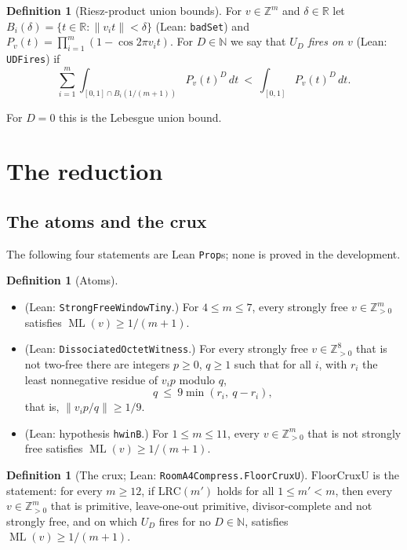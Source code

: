 \documentclass[11pt]{amsart}
\theoremstyle{plain}
\theoremstyle{definition}
\newtheorem{definition}[theorem]{Definition}
\theoremstyle{remark}
\newcommand{\nrm}[1]{\left\lVert #1 \right\rVert}
\newcommand{\ML}{\operatorname{ML}}
\newcommand{\Z}{\mathbb{Z}}
\newcommand{\R}{\mathbb{R}}
\newcommand{\N}{\mathbb{N}}
\newcommand{\lean}[1]{{\def\_{\textunderscore\allowbreak}\def\.{.\allowbreak}\texttt{#1}}}
\newcommand{\LRC}{\mathrm{LRC}}
\begin{document}
\begin{definition}[Riesz-product union bounds]\label{def:UD}
For $v\in\Z^m$ and $\delta\in\R$ let $B_i(\delta)=\{t\in\R:\nrm{v_it}<\delta\}$ (Lean:
\lean{badSet}) and $P_v(t)=\prod_{i=1}^m(1-\cos 2\pi v_it)$. For $D\in\N$ we say that
\emph{$U_D$ fires on $v$} (Lean: \lean{UDFires}) if
\[
  \sum_{i=1}^m\int_{[0,1]\cap B_i(1/(m+1))}P_v(t)^D\,dt\ <\ \int_{[0,1]}P_v(t)^D\,dt .
\]
\end{definition}

For $D=0$ this is the Lebesgue union bound.

\section{The reduction}\label{sec:reduction}

\subsection{The atoms and the crux}
The following four statements are Lean \texttt{Prop}s; none is proved in the development.

\begin{definition}[Atoms]\label{def:atoms}
\begin{itemize}
\item[A1] (Lean: \lean{StrongFreeWindowTiny}.) For $4\le m\le 7$, every strongly free
$v\in\Z_{>0}^m$ satisfies $\ML(v)\ge1/(m+1)$.
\item[A2] (Lean: \lean{DissociatedOctetWitness}.) For every strongly free $v\in\Z_{>0}^8$ that is
not two-free there are integers $p\ge0$, $q\ge1$ such that for all $i$, with $r_i$ the least
nonnegative residue of $v_ip$ modulo $q$,
\[
  q\ \le\ 9\min(r_i,\ q-r_i),
\]
that is, $\nrm{v_ip/q}\ge 1/9$.
\item[A3] (Lean: hypothesis \lean{hwinB}.) For $1\le m\le 11$, every $v\in\Z_{>0}^m$ that is not
strongly free satisfies $\ML(v)\ge1/(m+1)$.
\end{itemize}
\end{definition}

\begin{definition}[The crux; Lean: \lean{RoomA4Compress\.FloorCruxU}]\label{def:crux}
$\mathrm{FloorCruxU}$ is the statement: for every $m\ge12$, if $\LRC(m')$ holds for all
$1\le m'<m$, then every $v\in\Z_{>0}^m$ that is primitive, leave-one-out primitive,
divisor-complete and not strongly free, and on which $U_D$ fires for no $D\in\N$, satisfies
$\ML(v)\ge1/(m+1)$.
\end{definition}
\end{document}
